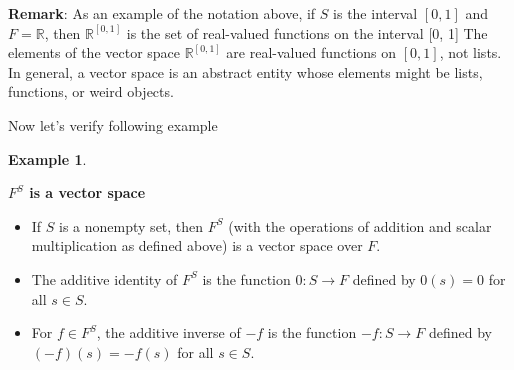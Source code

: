 \documentclass[
]{book}
\providecommand{\tightlist}{%
  \setlength{\itemsep}{0pt}\setlength{\parskip}{0pt}}
\theoremstyle{definition}
\theoremstyle{definition}
\newtheorem{example}{Example}[chapter]
\theoremstyle{definition}
\theoremstyle{definition}
\theoremstyle{remark}
\begin{document}
\textbf{Remark}: As an example of the notation above, if \(S\) is the interval \([0, 1]\) and \(F=\mathbb{R}\), then \(\mathbb{R}^{[0,1]}\) is the set of real-valued functions on the interval {[}0, 1{]}
The elements of the vector space \(\mathbb{R}^{[0,1]}\)
are real-valued functions on \([0, 1]\), not
lists. In general, a vector space is an
abstract entity whose elements might
be lists, functions, or weird objects.

Now let's verify following example

\begin{example}
\protect\hypertarget{exm:unnamed-chunk-26}{}\label{exm:unnamed-chunk-26}

\textbf{\(F^S\) is a vector space}

\begin{itemize}
\tightlist
\item
  If \(S\) is a nonempty set, then \(F^S\) (with the operations of addition and scalar multiplication as defined above) is a vector space over \(F\).
\item
  The additive identity of \(F^S\) is the function \(0 \colon S \rightarrow F\) defined by \(0(s) = 0\) for all \(s \in S\).
\item
  For \(f \in F^S\), the additive inverse of \(-f\) is the function \(-f \colon S \rightarrow F\) defined by \((-f)(s) = -f(s)\) for all \(s \in S\).
\end{itemize}

\end{example}
\end{document}
